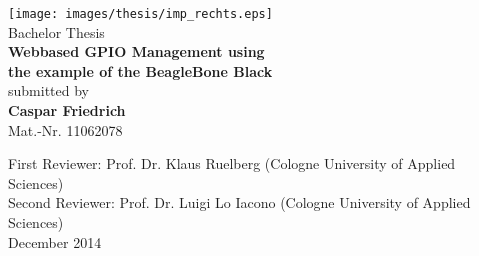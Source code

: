 \documentclass[thesis.tex]{subfiles}
\begin{document}
\begin{otherlanguage}{english}

\begin{titlepage}
\begin{center}

\texttt{[image: images/thesis/imp\_rechts.eps]}\\[3cm]

Bachelor Thesis\\[0.5cm]
{\sffamily \bfseries \Huge Webbased GPIO Management using\\[0.25cm]
the example of the BeagleBone Black}\\[2cm]

submitted by\\[0.5cm]
\textbf{Caspar Friedrich}\\[0.5cm]
Mat.-Nr. 11062078\\[0.5cm]

\vfill

First Reviewer: Prof. Dr. Klaus Ruelberg (Cologne University of Applied Sciences)\\[0.5cm]
Second Reviewer: Prof. Dr. Luigi Lo Iacono (Cologne University of Applied Sciences)\\[0.5cm]
December 2014

\end{center}
\end{titlepage}

\end{otherlanguage}
\end{document}
